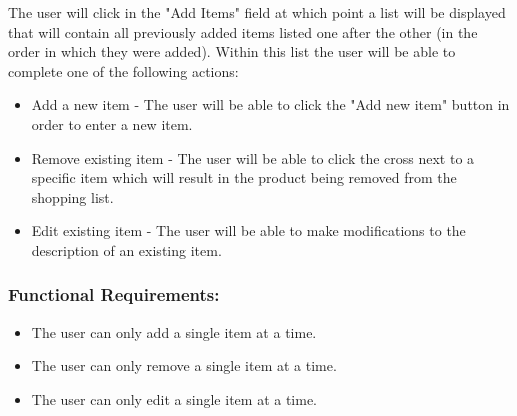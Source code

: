 \documentclass[10pt,twocolumn]{witseiepaper}
\begin{document}
		The user will click in the "Add Items" field at which point a list will be displayed that will contain all previously added items listed one after the other (in the order in which they were added). Within this list the user will be able to complete one of the following actions:
		
		\begin{itemize}
			\item Add a new item - The user will be able to click the "Add new item" button in order to enter a new item. 
			\item Remove existing item - The user will be able to click the cross next to a specific item which will result in the product being removed from the shopping list.
			\item Edit existing item - The user will be able to make modifications to the description of an existing item.
		\end{itemize}
		
		\subsubsection*{Functional Requirements:}
		
		\begin{itemize}
			\item The user can only add a single item at a time.
			\item The user can only remove a single item at a time.
			\item The user can only edit a single item at a time.
		\end{itemize}
		
		
\end{document}
